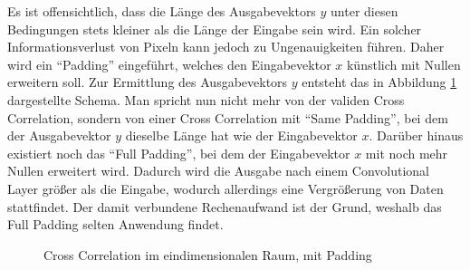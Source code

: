 \documentclass[12pt,a4]{article}
\begin{document}
Es ist offensichtlich, dass die Länge des Ausgabevektors $y$ unter diesen Bedingungen stets kleiner als die Länge der Eingabe sein wird. Ein solcher Informationsverlust von Pixeln kann jedoch zu Ungenauigkeiten führen. Daher wird ein \enquote{Padding} eingeführt, welches den Eingabevektor $x$ künstlich mit Nullen erweitern soll. Zur Ermittlung des Ausgabevektors $y$ entsteht das in Abbildung \ref{fig:CrossCorrelationWithPadding} dargestellte Schema. Man spricht nun nicht mehr von der validen Cross Correlation, sondern von einer Cross Correlation mit \enquote{Same Padding}, bei dem der Ausgabevektor $y$ dieselbe Länge hat wie der Eingabevektor $x$. Darüber hinaus existiert noch das \enquote{Full Padding}, bei dem der Eingabevektor $x$ mit noch mehr Nullen erweitert wird. Dadurch wird die Ausgabe nach einem Convolutional Layer größer als die Eingabe, wodurch allerdings eine Vergrößerung von Daten stattfindet. Der damit verbundene Rechenaufwand ist der Grund, weshalb das Full Padding selten Anwendung findet.

\begin{figure}[!h]
\centering
{}
\caption{Cross Correlation im eindimensionalen Raum, mit Padding}
\label{fig:CrossCorrelationWithPadding}
\end{figure}
\end{document}
